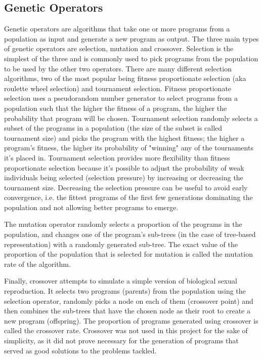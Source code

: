 \subsection{Genetic Operators}
Genetic operators are algorithms that take one or more programs from a population as input and generate a new program as output. The three main types of genetic operators are selection, mutation and crossover. Selection is the simplest of the three and is commonly used to pick programs from the population to be used by the other two operators. There are many different selection algorithms, two of the most popular being fitness proportionate selection (aka roulette wheel selection) and tournament selection. Fitness proportionate selection uses a pseudorandom number generator to select programs from a population such that the higher the fitness of a program, the higher the probability that program will be chosen. Tournament selection randomly selects a subset of the programs in a population (the size of the subset is called tournament size) and picks the program with the highest fitness; the higher a program's fitness, the higher its probability of "winning" any of the tournaments it's placed in. Tournament selection provides more flexibility than fitness proportionate selection because it's possible to adjust the probability of weak individuals being selected (selection pressure) by increasing or decreasing the tournament size. Decreasing the selection pressure can be useful to avoid early convergence, i.e. the fittest programs of the first few generations dominating the population and not allowing better programs to emerge.

The mutation operator randomly selects a proportion of the programs in the population, and changes one of the program's sub-trees (in the case of tree-based representation) with a randomly generated sub-tree. The exact value of the proportion of the population that is selected for mutation is called the mutation rate of the algorithm.

Finally, crossover attempts to simulate a simple version of biological sexual reproduction. It selects two programs (parents) from the population using the selection operator, randomly picks a node on each of them (crossover point) and then combines the sub-trees that have the chosen node as their root to create a new program (offspring). The proportion of programs generated using crossover is called the crossover rate. Crossover was not used in this project for the sake of simplicity, as it did not prove necessary for the generation of programs that served as good solutions to the problems tackled.


